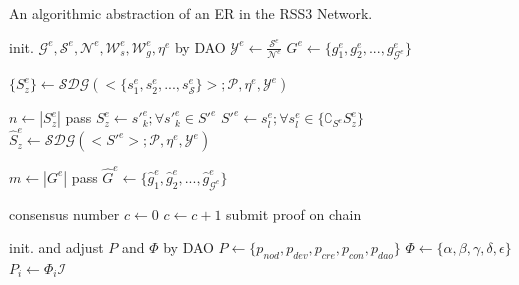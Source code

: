 \begin{algorithm}[tb!]
\caption{An algorithmic abstraction of an ER in the RSS3 Network.}
\label{alg:RSS3Network}
    \begin{algorithmic}[1]
    \FOR{each ER $e \in [0,\infty)$}

        \STATE init. $\mathcal{G}^e, \mathcal{S}^e, \mathcal{N}^e, \mathcal{W}^e_s, \mathcal{W}^e_g, \eta^e$ by DAO
        \STATE $\mathcal{Y}^e \leftarrow \frac{\mathcal{S}^e}{\mathcal{N}^e}$
            \STATE $G^e \leftarrow \{{g}^e_1, {g}^e_2, ..., {g}^e_{\mathcal{G}^e}\}$ %
        \ENDIF
        
        \STATE $\{S^e_z\} \leftarrow \mathcal{SDG}(<\{s^{e}_1, s^{e}_2,...,s^{e}_\mathcal{S}\}>;\mathcal{P},\eta^e, \mathcal{Y}^e)$

        \item[]

            \STATE $n \leftarrow |S^e_z|$
                    \STATE pass
                \EndCase
                    \STATE $S^e_z \leftarrow {s'}^e_k; \forall {s'}^e_k \in {S'}^e$
                \EndCase
                    \STATE ${S'}^e \leftarrow s^e_l; \forall s^e_l \in \{\complement_{S^e}{S^e_z}\}$
                    \STATE $\hat{S}^e_z \leftarrow \mathcal{SDG}(<{S'}^e>;\mathcal{P},\eta^e, \mathcal{Y}^e)$
                \EndCase
        \ENDFOR
        \item[]

        \STATE $m \leftarrow |G^e|$
                \STATE pass
            \EndCase
                \STATE $\hat{G}^e \leftarrow \{\hat{g}^e_1, \hat{g}^e_2, ..., \hat{g}^e_{\mathcal{G}^e}\}$
            \EndCase
        
        
        \item[]

        \STATE consensus number $c\leftarrow0$
                \STATE $c\leftarrow c+1$
            \ENDIF
        \ENDFOR
            \STATE submit proof on chain
        \ENDIF

        \item[]
        
        \STATE init. and adjust $P$ and $\Phi$ by DAO
        \STATE $P \leftarrow \{p_{nod}, p_{dev}, p_{cre}, p_{con}, p_{dao}\}$
        \STATE $\Phi \leftarrow \{\alpha,\beta,\gamma,\delta,\epsilon\}$
            \STATE $P_i \leftarrow \Phi_i \mathcal{I}$
        \ENDFOR

    \ENDFOR
    \end{algorithmic} 
\end{algorithm}

